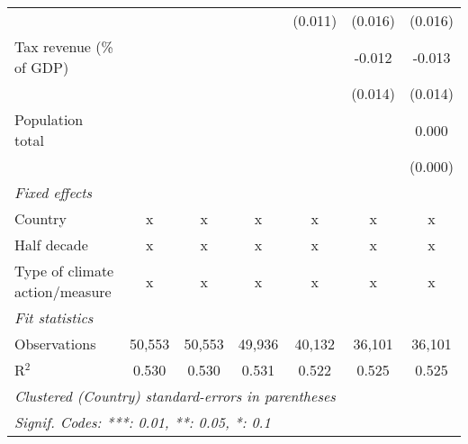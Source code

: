 \begin{tabular}{lcccccc}
                                        &               &                &                & (0.011)       & (0.016)       & (0.016)\\   
   Tax revenue (\% of GDP)              &               &                &                &               & -0.012        & -0.013\\   
                                        &               &                &                &               & (0.014)       & (0.014)\\   
   Population total                     &               &                &                &               &               & 0.000\\   
                                        &               &                &                &               &               & (0.000)\\   
   \emph{Fixed effects}\\
   Country                              & x             & x              & x              & x             & x             & x\\  
   Half decade                          & x             & x              & x              & x             & x             & x\\  
   Type of climate action/measure       & x             & x              & x              & x             & x             & x\\  
   \midrule \emph{Fit statistics}\\
   Observations                         & 50,553        & 50,553         & 49,936         & 40,132        & 36,101        & 36,101\\  
   R$^2$                                & 0.530         & 0.530          & 0.531          & 0.522         & 0.525         & 0.525\\  
   \midrule
   \multicolumn{7}{l}{\emph{Clustered (Country) standard-errors in parentheses}}\\
   \multicolumn{7}{l}{\emph{Signif. Codes: ***: 0.01, **: 0.05, *: 0.1}}\\
\end{tabular}
\par\endgroup


